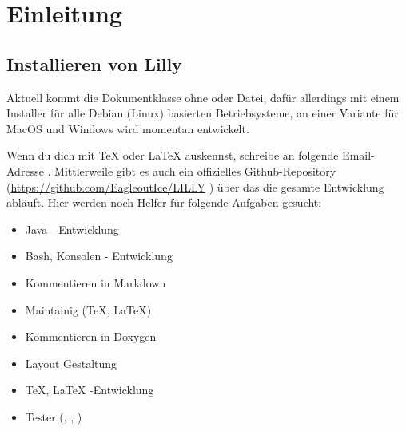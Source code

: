 \chapter{Einleitung}
\section{Installieren von Lilly}
Aktuell kommt die Dokumentklasse ohne  oder  Datei, dafür allerdings mit einem Installer für alle Debian (Linux) basierten Betriebsysteme, an einer Variante für MacOS und Windows wird momentan entwickelt.

\begin{bemerkung}[Mithilfe]
    Wenn du dich mit \TeX{} oder \LaTeX{} auskennst, schreibe an folgende Email-Adresse \T{\AUTHORMAIL}.\smallskip\newline
    Mittlerweile gibt es auch ein offizielles Github-Repository (\url{https://github.com/EagleoutIce/LILLY} \href{https://github.com/EagleoutIce/LILLY}{\faGithub})
    über das die gesamte Entwicklung abläuft. Hier werden noch Helfer für folgende Aufgaben gesucht:
    \begin{multicols}{2}
        \begin{itemize}[label=$\diamond$]
            \item Java - Entwicklung
            \item Bash, Konsolen - Entwicklung
            \item Kommentieren in Markdown
            \item Maintainig (\TeX, \LaTeX)
            \item Kommentieren in Doxygen
            \item Layout Gestaltung
            \item \TeX, \LaTeX{} -Entwicklung
            \item Tester (\faLinux, \faApple, \faWindows)
        \end{itemize}
    \end{multicols}
\end{bemerkung}

